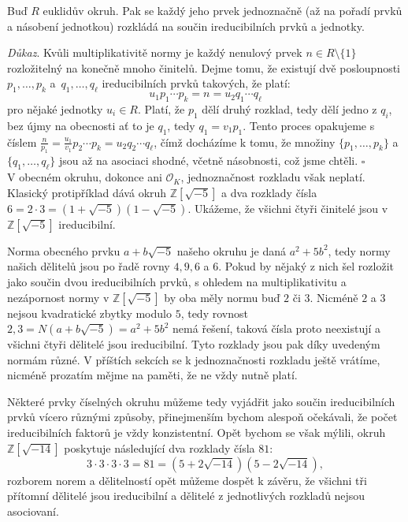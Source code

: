 \documentclass[12pt]{report}
\begin{document}
\begin{dusledek}
Buď $R$ euklidův okruh. Pak se každý jeho prvek jednoznačně (až na pořadí prvků a násobení jednotkou) rozkládá na součin ireducibilních prvků a jednotky.
\end{dusledek}
\noindent \textit{Důkaz}. Kvůli multiplikativitě normy je každý nenulový prvek $n \in R \setminus \lbrace 1 \rbrace$ rozložitelný na konečně mnoho činitelů. Dejme tomu, že existují dvě posloupnosti $p_1, \dots, p_k$ a~$q_1,\dots, q_{\ell}$ ireducibilních prvků takových, že platí:
\begin{equation*}
u_1 p_1 \cdots p_k = n = u_2 q_1 \cdots q_{\ell}
\end{equation*}
pro nějaké jednotky $u_i \in R$. Platí, že $p_1$ dělí druhý rozklad, tedy dělí jedno z $q_i$, bez újmy na obecnosti ať to je $q_1$, tedy $q_1 = v_1 p_1$. Tento proces opakujeme s číslem $\frac{n}{p_1} =\frac{u_1}{v_1} p_2 \cdots p_k = u_2 q_2 \cdots q_{\ell}$, čímž docházíme k tomu, že množiny $\lbrace p_1, \dots, p_k \rbrace$ a $\lbrace q_1,\dots,q_{\ell} \rbrace$ jsou až na asociaci shodné, včetně násobnosti, což jsme chtěli. \hfill $\square$\\
 
V obecném okruhu, dokonce ani $\mathcal{O}_K$, jednoznačnost rozkladu však neplatí. Klasický protipříklad dává okruh $\mathbb{Z}[\sqrt{-5}]$ a dva rozklady čísla $6 = 2 \cdot 3 = (1+\sqrt{-5})(1-\sqrt{-5})$. Ukážeme, že všichni čtyři činitelé jsou v $\mathbb{Z}[\sqrt{-5}]$ ireducibilní.

Norma obecného prvku $a+b\sqrt{-5}$ našeho okruhu je daná $a^2+5b^2$, tedy normy našich dělitelů jsou po řadě rovny $4,9,6$ a $6$. Pokud by nějaký z nich šel rozložit jako součin dvou ireducibilních prvků, s ohledem na multiplikativitu a nezápornost normy v $\mathbb{Z}[\sqrt{-5}]$ by oba měly normu buď $2$ či $3$. Nicméně $2$ a $3$ nejsou kvadratické zbytky modulo $5$, tedy rovnost $2,3 = N(a+b\sqrt{-5}) = a^2+5b^2$ nemá řešení, taková čísla proto neexistují a všichni čtyři dělitelé jsou ireducibilní. Tyto rozklady jsou pak díky uvedeným normám různé. V příštích sekcích se k jednoznačnosti rozkladu ještě vrátíme, nicméně prozatím mějme na paměti, že ne vždy nutně platí.

Některé prvky číselných okruhu můžeme tedy vyjádřit jako součin ireducibilních prvků vícero různými způsoby, přinejmenším bychom alespoň očekávali, že počet ireducibilních faktorů je vždy konzistentní. Opět bychom se však mýlili, okruh $\mathbb{Z}[\sqrt{-14}]$ poskytuje následující dva rozklady čísla $81$:
\begin{equation*}
3 \cdot 3 \cdot 3 \cdot 3 = 81 = (5+2\sqrt{-14})(5-2\sqrt{-14}),
\end{equation*}
rozborem norem a dělitelností opět můžeme dospět k závěru, že všichni tři přítomní dělitelé jsou ireducibilní a dělitelé z jednotlivých rozkladů nejsou asociovaní.
\end{document}
